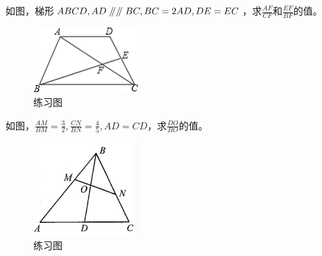 \documentclass{ecnuthesis}
\newcommand\px{\mathrel{/\mkern-5mu/}}  %
\begin{document}
\begin{problem}
    如图，梯形$ABCD,AD\px \px BC,BC=2AD,DE=EC$，求$\frac{AF}{CF}$和$\frac{EF}{BF}$的值。
\end{problem}
\begin{figure}[H]
\centering
\includegraphics[width=4cm]{picture/853.png}
\caption{练习图}
\end{figure}
\begin{problem}
    如图，$\frac{AM}{BM}=\frac{3}{2},\frac{CN}{BN}=\frac{4}{5},AD=CD$，求$\frac{DO}{BO}$的值。\\
\end{problem}
\begin{figure}[H]
\centering
\includegraphics[width=4cm]{picture/852.png}
\caption{练习图}
\end{figure}
\clearpage
\end{document}

